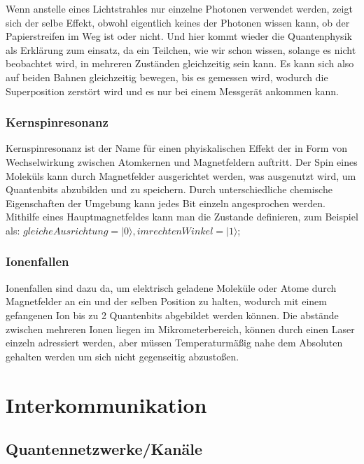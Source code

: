 Wenn anstelle eines Lichtstrahles nur einzelne Photonen verwendet werden, zeigt sich der selbe Effekt, obwohl eigentlich keines der Photonen wissen kann, ob der Papierstreifen im Weg ist oder nicht. Und hier kommt wieder die Quantenphysik als Erklärung zum einsatz, da ein Teilchen, wie wir schon wissen, solange es nicht beobachtet wird, in mehreren Zuständen gleichzeitig sein kann. Es kann sich also auf beiden Bahnen gleichzeitig bewegen, bis es gemessen wird, wodurch die Superposition zerstört wird und es nur bei einem Messgerät ankommen kann.

\subsubsection{Kernspinresonanz}

Kernspinresonanz ist der Name für einen phyiskalischen Effekt der in Form von Wechselwirkung zwischen Atomkernen und Magnetfeldern auftritt. Der Spin eines Moleküls kann durch Magnetfelder ausgerichtet werden, was ausgenutzt wird, um Quantenbits abzubilden und zu speichern. Durch unterschiedliche chemische Eigenschaften der Umgebung kann jedes Bit einzeln angesprochen werden. Mithilfe eines Hauptmagnetfeldes kann man die Zustande definieren, zum Beispiel als: $gleiche Ausrichtung = |0\rangle, im rechten Winkel = |1\rangle$;

\subsubsection{Ionenfallen}

Ionenfallen sind dazu da, um elektrisch geladene Moleküle oder Atome durch Magnetfelder an ein und der selben Position zu halten, wodurch mit einem gefangenen Ion bis zu 2 Quantenbits abgebildet werden können. Die abstände zwischen mehreren Ionen liegen im Mikrometerbereich, können durch einen Laser einzeln adressiert werden, aber müssen Temperaturmäßig nahe dem Absoluten gehalten werden um sich nicht gegenseitig abzustoßen.

\section{Interkommunikation}
\label{sec:Interkommunikation}


\subsection{Quantennetzwerke/Kanäle}
\label{sec:Quantennetzwerke/Kanale}

